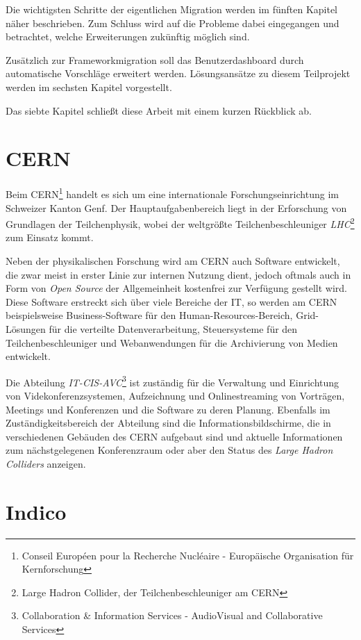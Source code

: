 Die wichtigsten Schritte der eigentlichen Migration werden im fünften Kapitel näher beschrieben. Zum
Schluss wird auf die Probleme dabei eingegangen und betrachtet, welche Erweiterungen zukünftig
möglich sind.

Zusätzlich zur Frameworkmigration soll das Benutzerdashboard durch automatische Vorschläge erweitert
werden. Lösungsansätze zu diesem Teilprojekt werden im sechsten Kapitel vorgestellt.

Das siebte Kapitel schließt diese Arbeit mit einem kurzen Rückblick ab.


\section{CERN}

Beim CERN\footnote{Conseil Européen pour la Recherche Nucléaire - Europäische Organisation für
Kernforschung} handelt es sich um eine internationale Forschungseinrichtung im Schweizer Kanton
Genf. Der Hauptaufgabenbereich liegt in der Erforschung von Grundlagen der Teilchenphysik, wobei der
weltgrößte Teilchenbeschleuniger \emph{LHC}\footnote{Large Hadron Collider, der
Teilchenbeschleuniger am CERN} zum Einsatz kommt.

Neben der physikalischen Forschung wird am CERN auch Software entwickelt, die zwar meist in erster
Linie zur internen Nutzung dient, jedoch oftmals auch in Form von \emph{Open Source} der
Allgemeinheit kostenfrei zur Verfügung gestellt wird. Diese Software erstreckt sich über viele
Bereiche der IT, so werden am CERN beispielsweise Business-Software für den Human-Resources-Bereich,
Grid-Lösungen für die verteilte Datenverarbeitung, Steuersysteme für den Teilchenbeschleuniger und
Webanwendungen für die Archivierung von Medien entwickelt.

Die Abteilung \emph{IT-CIS-AVC}\footnote{Collaboration \& Information Services - AudioVisual and
Collaborative Services} ist zuständig für die Verwaltung und Einrichtung von Videkonferenzsystemen,
Aufzeichnung und Onlinestreaming von Vorträgen, Meetings und Konferenzen und die Software zu deren
Planung. Ebenfalls im Zuständigkeitsbereich der Abteilung sind die Informationsbildschirme, die in
verschiedenen Gebäuden des CERN aufgebaut sind und aktuelle Informationen zum nächstgelegenen
Konferenzraum oder aber den Status des \emph{Large Hadron Colliders} anzeigen.


\section{Indico}

